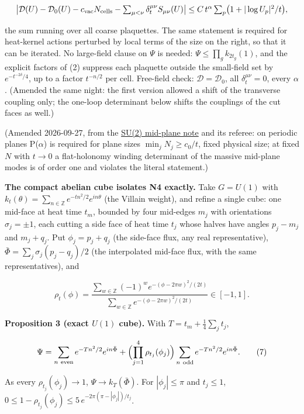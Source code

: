 \documentclass[11pt,a4paper]{article}
\begin{document}
\[\bigl|\mathcal D(U)-\mathcal D_0(U)-c_{\rm vac}N_{\rm cells}
-\textstyle\sum_{\mu<\nu}\delta_t^{\mu\nu}S_{\mu\nu}(U)\bigr|
\le C\,t^{\alpha}\sum_p\bigl(1+|\log U_p|^2/t\bigr),\]

the sum running over all coarse plaquettes. The same statement is
required for heat-kernel actions perturbed by local terms of the size on
the right, so that it can be iterated. No large-field clause on \(\Psi\)
is needed: \(\Psi\le\prod_gk_{2t_g}(1)\), and the explicit factors of
(2) suppress each plaquette outside the small-field set by
\(e^{-t^{-2\delta}/4}\), up to a factor \(t^{-n/2}\) per cell.
Free-field check: \(\mathcal D=\mathcal D_0\), all
\(\delta_t^{\mu\nu}=0\), every \(\alpha\). (Amended the same night: the
first version allowed a shift of the transverse coupling only; the
one-loop determinant below shifts the couplings of the cut faces as
well.)

(Amended 2026-09-27, from the \href{su2-midplane-order-t.md}{SU(2)
mid-plane note} and its referee: on periodic planes P(\(\alpha\)) is
required for plane sizes \(\min_jN_j\ge c_0/t\), fixed physical size; at
fixed \(N\) with \(t\to0\) a flat-holonomy winding determinant of the
massive mid-plane modes is of order one and violates the literal
statement.)

\textbf{The compact abelian cube isolates N4 exactly.} Take \(G=U(1)\)
with \(k_t(\theta)=\sum_{n\in\mathbb Z}e^{-tn^2/2}e^{in\theta}\) (the
Villain weight), and refine a single cube: one mid-face at heat time
\(t_m\), bounded by four mid-edges \(m_j\) with orientations
\(\sigma_j=\pm1\), each cutting a side face of heat time \(t_j\) whose
halves have angles \(p_j-m_j\) and \(m_j+q_j\). Put \(\phi_j=p_j+q_j\)
(the side-face flux, any real representative),
\(\bar\Phi=\sum_j\sigma_j(p_j-q_j)/2\) (the interpolated mid-face flux,
with the same representatives), and

\[\rho_t(\phi)=\frac{\sum_{w\in\mathbb Z}(-1)^we^{-(\phi-2\pi w)^2/(2t)}}
{\sum_{w\in\mathbb Z}e^{-(\phi-2\pi w)^2/(2t)}}\in[-1,1].\]

\textbf{Proposition 3 (exact \(U(1)\) cube).} With
\(T=t_m+\tfrac14\sum_jt_j\),

\[\Psi=\sum_{n\ {\rm even}}e^{-Tn^2/2}e^{in\bar\Phi}
+\Bigl(\prod_{j=1}^4\rho_{t_j}(\phi_j)\Bigr)
\sum_{n\ {\rm odd}}e^{-Tn^2/2}e^{in\bar\Phi}. \tag{7}\]

As every \(\rho_{t_j}(\phi_j)\to1\), \(\Psi\to k_T(\bar\Phi)\). For
\(|\phi_j|\le\pi\) and \(t_j\le1\),
\(0\le1-\rho_{t_j}(\phi_j)\le5\,e^{-2\pi(\pi-|\phi_j|)/t_j}\).
\end{document}
